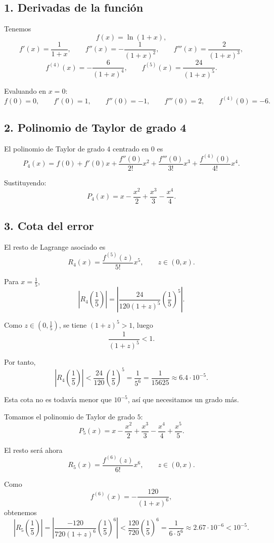 \documentclass[12pt]{article}
\begin{document}
\subsection*{1. Derivadas de la función}

Tenemos
\[
f(x)=\ln(1+x),
\]
\[
f'(x)=\frac{1}{1+x},
\qquad
f''(x)=-\frac{1}{(1+x)^2},
\qquad
f'''(x)=\frac{2}{(1+x)^3},
\]
\[
f^{(4)}(x)=-\frac{6}{(1+x)^4},
\qquad
f^{(5)}(x)=\frac{24}{(1+x)^5}.
\]

Evaluando en \(x=0\):
\[
f(0)=0,\qquad f'(0)=1,\qquad f''(0)=-1,\qquad f'''(0)=2,\qquad f^{(4)}(0)=-6.
\]

\subsection*{2. Polinomio de Taylor de grado 4}

El polinomio de Taylor de grado \(4\) centrado en \(0\) es
\[
P_4(x)=f(0)+f'(0)x+\frac{f''(0)}{2!}x^2+\frac{f'''(0)}{3!}x^3+\frac{f^{(4)}(0)}{4!}x^4.
\]

Sustituyendo:
\[
P_4(x)=x-\frac{x^2}{2}+\frac{x^3}{3}-\frac{x^4}{4}.
\]

\subsection*{3. Cota del error}

El resto de Lagrange asociado es
\[
R_4(x)=\frac{f^{(5)}(z)}{5!}x^5,
\qquad z\in(0,x).
\]

Para \(x=\frac{1}{5}\),
\[
\left|R_4\left(\frac{1}{5}\right)\right|
=
\left|
\frac{24}{120(1+z)^5}\left(\frac{1}{5}\right)^5
\right|.
\]

Como \(z\in\left(0,\frac{1}{5}\right)\), se tiene \((1+z)^5>1\), luego
\[
\frac{1}{(1+z)^5}<1.
\]

Por tanto,
\[
\left|R_4\left(\frac{1}{5}\right)\right|
<
\frac{24}{120}\left(\frac{1}{5}\right)^5
=
\frac{1}{5^6}
=
\frac{1}{15625}
\approx 6.4\cdot 10^{-5}.
\]

Esta cota no es todavía menor que \(10^{-5}\), así que necesitamos un grado más.

Tomamos el polinomio de Taylor de grado \(5\):
\[
P_5(x)=x-\frac{x^2}{2}+\frac{x^3}{3}-\frac{x^4}{4}+\frac{x^5}{5}.
\]

El resto será ahora
\[
R_5(x)=\frac{f^{(6)}(z)}{6!}x^6,
\qquad z\in(0,x).
\]

Como
\[
f^{(6)}(x)=-\frac{120}{(1+x)^6},
\]
obtenemos
\[
\left|R_5\left(\frac{1}{5}\right)\right|
=
\left|
\frac{-120}{720(1+z)^6}\left(\frac{1}{5}\right)^6
\right|
<
\frac{120}{720}\left(\frac{1}{5}\right)^6
=
\frac{1}{6\cdot 5^6}
\approx 2.67\cdot 10^{-6}<10^{-5}.
\]
\end{document}
